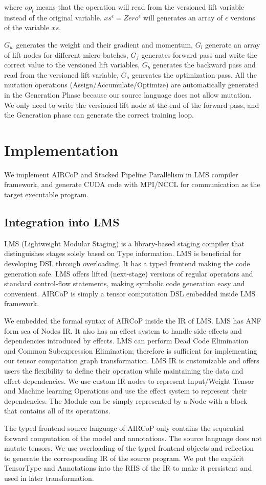 \documentclass[sigplan, nonacm]{acmart}\settopmatter{printfolios=true,printccs=false,printacmref=false}
\begin{document}
where $op_l$ means that the operation will read from the versioned lift variable instead of the original variable. $xs^\epsilon = Zero^\epsilon$ will generates an array of $\epsilon$ versions of the variable $xs$.\par
$G_w$ generates the weight and their gradient and momentum, $G_l$ generate an array of lift nodes for different micro-batches, $G_f$ generates forward pass and write the correct value to the versioned lift variables, $G_b$ generates the backward pass and read from the versioned lift variable, $G_o$ generates the optimization pass. All the mutation operations (Assign/Accumulate/Optimize) are automatically generated in the Generation Phase because our source language does not allow mutation. We only need to write the versioned lift node at the end of the forward pass, and the Generation phase can generate the correct training loop.
\section{Implementation} \label{implementation}
We implement AIRCoP and Stacked Pipeline Parallelism in LMS compiler framework\cite{rompf2010lightweight}, and generate CUDA\cite{sanders2010cuda} code with MPI\cite{gropp1999using}/NCCL for communication as the target executable program.\par
\subsection{Integration into LMS}
LMS (Lightweight Modular Staging) is a library-based staging compiler that distinguishes stages solely based on Type information. LMS is beneficial for developing DSL through overloading. It has a typed frontend making the code generation safe. LMS offers lifted (next-stage) versions of regular operators and standard control-flow statements, making symbolic code generation easy and convenient. AIRCoP is simply a tensor computation DSL embedded inside LMS framework.\par
We embedded the formal syntax of AIRCoP inside the IR of LMS. LMS has ANF\cite{flanagan1993essence} form sea of Nodes\cite{click1995simple} IR. It also has an effect system to handle side effects and dependencies introduced by effects. LMS can perform Dead Code Elimination and Common Subexpression Elimination; therefore is sufficient for implementing our tensor computation graph transformation. LMS IR is customizable and offers users the flexibility to define their operation while maintaining the data and effect dependencies. We use custom IR nodes to represent Input/Weight Tensor and Machine learning Operations and use the effect system to represent their dependencies. The Module can be simply represented by a Node with a block that contains all of its operations. \par
The typed frontend source language of AIRCoP only contains the sequential forward computation of the model and annotations. The source language does not mutate tensors. We use overloading of the typed frontend objects and reflection to generate the corresponding IR of the source program. We put the explicit TensorType and Annotations into the RHS of the IR to make it persistent and used in later transformation. \par
\end{document}

